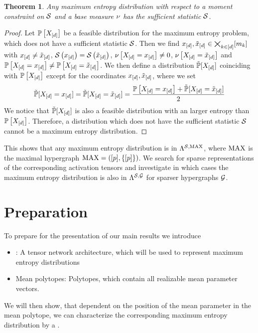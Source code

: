\documentclass[aps,onecolumn,nofootinbib,pra]{article}
\newtheorem{theorem}{Theorem}
\begin{document}
    \begin{theorem}
        \label{the:maxEntWithSufficientStatistic}
        Any maximum entropy distribution with respect to a moment constraint on $\mathcal{S}$ and a base measure $\nu$ has the sufficient statistic $\mathcal{S}$.
    \end{theorem}
    \begin{proof}
        Let $\mathbb{P}\left[X_{[d]}\right]$ be a feasible distribution for the maximum entropy problem, which does not have a sufficient statistic $\mathcal{S}$.
        Then we find $x_{[d]},\tilde{x}_{[d]}\in\bigtimes_{k\in[d]}[m_{k}]$ with $x_{[d]}\neq\tilde{x}_{[d]}$, $\mathcal{S}\left(x_{[d]}\right)=\mathcal{S}\left(\tilde{x}_{[d]}\right)$, $\nu\left[X_{[d]}=x_{[d]}\right]\neq0$, $\nu\left[X_{[d]}=\tilde{x}_{[d]}\right]$ and $\mathbb{P}\left[X_{[d]}=x_{[d]}\right]\neq\mathbb{P}\left[X_{[d]}=\tilde{x}_{[d]}\right]$.
        We then define a distribution $\tilde{\mathbb{P}}[X_{[d]}]$ coinciding with $\mathbb{P}\left[X_{[d]}\right]$ except for the coordinates $x_{[d]},\tilde{x}_{[d]}$, where we set
        \begin{align*}
            \tilde{\mathbb{P}}[X_{[d]}=x_{[d]}] = \tilde{\mathbb{P}}[X_{[d]}=\tilde{x}_{[d]}] = \frac{\mathbb{P}\left[X_{[d]}=x_{[d]}\right]+\tilde{\mathbb{P}}[X_{[d]}=\tilde{x}_{[d]}]}{2}
        \end{align*}
        We notice that $\tilde{\mathbb{P}}[X_{[d]}]$ is also a feasible distribution with an larger entropy than $\mathbb{P}\left[X_{[d]}\right]$.
        Therefore, a distribution which does not have the sufficient statistic $\mathcal{S}$ cannot be a maximum entropy distribution.
    \end{proof}

    This shows that any maximum entropy distribution is in $\Lambda^{\mathcal{S},\mathrm{MAX}}$, where $\mathrm{MAX}$ is the maximal hypergraph $\mathrm{MAX}=([p],\{[p]\})$.
    We search for sparse representations of the corresponding activation tensors and investigate in which cases the maximum entropy distribution is also in $\Lambda^{\mathcal{S},\mathcal{G}}$ for sparser hypergraphs $\mathcal{G}$.


    \section{Preparation}

    To prepare for the presentation of our main results we introduce
    \begin{itemize}
        \item \ComputationActivationNetworks{}: A tensor network architecture, which will be used to represent maximum entropy distributions
        \item Mean polytopes: Polytopes, which contain all realizable mean parameter vectors.
    \end{itemize}
    We will then show, that dependent on the position of the mean parameter in the mean polytope, we can characterize the corresponding maximum entropy distribution by a \ComputationActivationNetwork{}.
\end{document}
